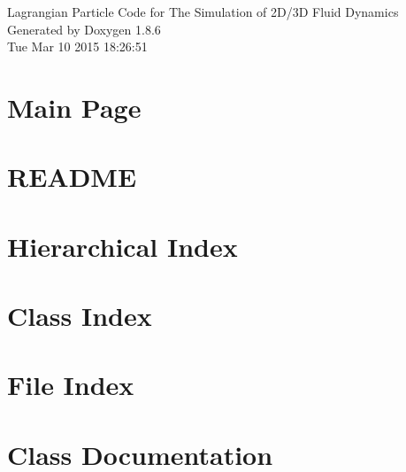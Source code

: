 \documentclass[twoside]{book}
\newcommand{\clearemptydoublepage}{%
  \newpage{\pagestyle{empty}\cleardoublepage}%
}
\begin{document}
\hypersetup{pageanchor=false}
\begin{titlepage}
\vspace*{7cm}
\begin{center}%
{\Large Lagrangian Particle Code for The Simulation of 2\-D/3\-D Fluid Dynamics }\\
\vspace*{1cm}
{\large Generated by Doxygen 1.8.6}\\
\vspace*{0.5cm}
{\small Tue Mar 10 2015 18:26:51}\\
\end{center}
\end{titlepage}
\clearemptydoublepage
\tableofcontents
\clearemptydoublepage
{}
\hypersetup{pageanchor=true}

\chapter{Main Page}
\label{index}\hypertarget{index}{}
\chapter{R\-E\-A\-D\-M\-E}
\label{md_README}
\hypertarget{md_README}{}

\chapter{Hierarchical Index}

\chapter{Class Index}

\chapter{File Index}

\chapter{Class Documentation}



































\end{document}
